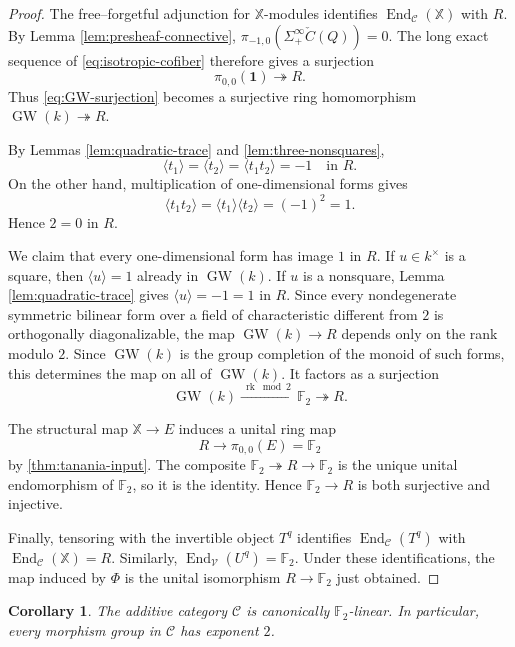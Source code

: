 \documentclass[11pt]{amsart}
\numberwithin{equation}{section}
\newtheorem{corollary}[theorem]{Corollary}
\theoremstyle{definition}
\theoremstyle{remark}
\DeclareMathOperator{\End}{End}
\DeclareMathOperator{\GW}{GW}
\DeclareMathOperator{\rk}{rk}
\newcommand{\F}{\mathbb F_2}
\newcommand{\X}{\mathbb X}
\newcommand{\one}{\mathbf 1}
\newcommand{\C}{\mathcal C}
\newcommand{\V}{\mathcal V}
\begin{document}
\begin{proof}
The free--forgetful adjunction for $\X$-modules identifies
$\End_{\C}(\X)$ with $R$.  By Lemma \ref{lem:presheaf-connective}, $\pi_{-1,0}(\Sigma^\infty_+\check C(Q))=0$.  The long exact sequence of
\eqref{eq:isotropic-cofiber} therefore gives a surjection
\begin{equation}\label{eq:GW-surjection}
  \pi_{0,0}(\one)\twoheadrightarrow R.
\end{equation}
  Thus
\eqref{eq:GW-surjection} becomes a surjective ring homomorphism
$\GW(k)\twoheadrightarrow R$.

By Lemmas \ref{lem:quadratic-trace} and \ref{lem:three-nonsquares},
\[
  \langle t_1\rangle=\langle t_2\rangle
  =\langle t_1t_2\rangle=-1
  \quad\text{in }R.
\]
  On the other hand, multiplication of one-dimensional
forms gives
\[
  \langle t_1t_2\rangle
  =\langle t_1\rangle\langle t_2\rangle=(-1)^2=1.
\]
Hence $2=0$ in $R$.

We claim that every one-dimensional form has image $1$ in $R$.  If
$u\in k^\times$ is a square, then $\langle u\rangle=1$ already in
$\GW(k)$.  If $u$ is a nonsquare, Lemma \ref{lem:quadratic-trace} gives
$\langle u\rangle=-1=1$ in $R$.  Since every nondegenerate symmetric
bilinear form over a field of characteristic different from $2$ is
orthogonally diagonalizable, the map $\GW(k)\to R$ depends only on the rank
modulo $2$.  Since $\GW(k)$ is the group completion of the monoid of such
forms, this determines the map on all of $\GW(k)$.  It factors as a
surjection
\[
  \GW(k)\xrightarrow{\ \rk\bmod2\ }\F\twoheadrightarrow R.
\]

The structural map $\X\to E$ induces a unital ring map
\[
  R\longrightarrow\pi_{0,0}(E)=\F
\]
by \cref{thm:tanania-input}.  The composite
$\F\twoheadrightarrow R\to\F$ is the unique unital endomorphism of $\F$,
so it is the identity.  Hence $\F\to R$ is both surjective and injective.

Finally, tensoring with the invertible object $T^q$ identifies
$\End_{\C}(T^q)$ with $\End_{\C}(\X)=R$.  Similarly,
$\End_{\V}(U^q)=\F$.  Under these identifications, the map induced by
$\Phi$ is the unital isomorphism $R\to\F$ just obtained.
\end{proof}

\begin{corollary}
\label{cor:F2-linear}
The additive category $\C$ is canonically $\F$-linear.  In particular,
every morphism group in $\C$ has exponent $2$.
\end{corollary}
\end{document}
